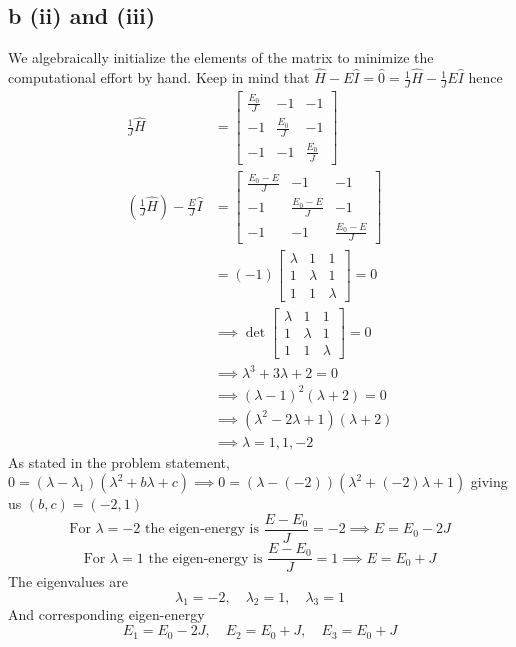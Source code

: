 \documentclass[letter]{article}
\begin{document}
\subsection*{b (ii) and (iii)} 
We algebraically initialize the elements of the matrix to minimize the computational effort by hand. Keep in mind that $\hat{H} - E \hat{I } = \hat{0} = \frac{1}{J} \hat{H} - \frac{1}{J} E \hat{I} $ hence 
\begin{align*}
	\frac{1}{J} \hat{H} &= 
	\begin{bmatrix} \frac{E_0}{J} & -1 & -1 \\ -1 &  \frac{E_0}{J} & -1 \\ 
	-1 & -1 &  \frac{E_0}{J}\end{bmatrix}  
	\\
		\left(\frac{1}{J} \hat{H}\right) - \frac{E}{J} \hat{I} &=
	\begin{bmatrix} \frac{E_0 - E}{J} & -1 & -1 \\ -1 &  \frac{E_0 - E}{J} & -1 \\ 
	-1 & -1 &  \frac{E_0 - E}{J}\end{bmatrix}   \\ 
					  &= (-1) \begin{bmatrix} \lambda & 1 & 1 \\ 
					  1 & \lambda & 1 \\ 1 & 1 & \lambda \end{bmatrix} \tag{$\lambda = (E - E_0 )/ J$}  = 0  \\ 
					  & \implies \det  
					   \begin{bmatrix} \lambda & 1 & 1 \\ 
					  1 & \lambda & 1 \\ 1 & 1 & \lambda \end{bmatrix}  = 0\\  
								   & \implies \lambda^3 + 3 \lambda + 2 = 0  \\ 
								   & \implies ( \lambda - 1)^2 (\lambda + 2) = 0 \\
& \implies (\lambda^2 - 2 \lambda + 1 ) (\lambda + 2 ) \\ 
	& \implies \lambda = 1, 1, -2 
\end{align*}
As stated in the problem statement, $0 = (\lambda - \lambda_1 ) (\lambda^2 + b \lambda + c) \implies 0 = (\lambda - (-2)) (\lambda^2 + (-2) \lambda + 1  )$ giving us $(b,c) = (-2, 1)$
\[
	\text{For } \lambda = -2 \text{ the eigen-energy is } \frac{E - E_0}{J} = -2 \implies E = E_0 - 2 J  
\] 
\[
	\text{For } \lambda = 1 \text{ the eigen-energy is } \frac{E - E_0}{J} = 1 \implies E = E_0 +  J  
\]
The eigenvalues are 
\[
\lambda_1 = -2, \quad \lambda_2 = 1, \quad \lambda_3 = 1
\]
And corresponding eigen-energy
\[
E_1 = E_0 - 2 J , \quad E_2 = E_0+ J , \quad E_3 = E_0 + J
\] 
\end{document}

